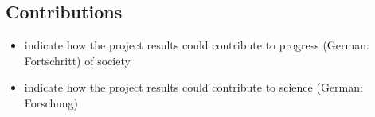 \subsection{Contributions}

\begin{itemize}
    \item indicate how the project results could contribute to progress (German: Fortschritt) of society
    \item indicate how the project results could contribute to science (German: Forschung)
\end{itemize}
